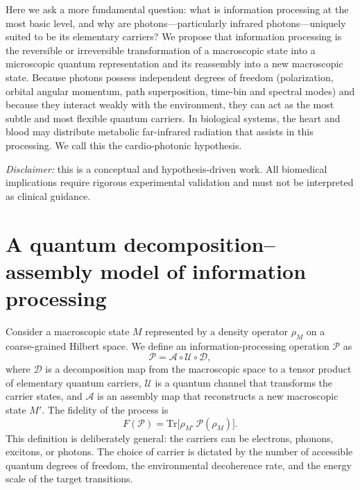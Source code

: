 \documentclass[11pt,a4paper]{article}
\begin{document}
Here we ask a more fundamental question: what is information processing at the most basic level, and why are photons---particularly infrared photons---uniquely suited to be its elementary carriers? We propose that information processing is the reversible or irreversible transformation of a macroscopic state into a microscopic quantum representation and its reassembly into a new macroscopic state. Because photons possess independent degrees of freedom (polarization, orbital angular momentum, path superposition, time-bin and spectral modes) and because they interact weakly with the environment, they can act as the most subtle and most flexible quantum carriers. In biological systems, the heart and blood may distribute metabolic far-infrared radiation that assists in this processing. We call this the cardio-photonic hypothesis.

\textit{Disclaimer:} this is a conceptual and hypothesis-driven work. All biomedical implications require rigorous experimental validation and must not be interpreted as clinical guidance.

\section*{A quantum decomposition--assembly model of information processing}

Consider a macroscopic state $M$ represented by a density operator $\rho_M$ on a coarse-grained Hilbert space. We define an information-processing operation $\mathcal{P}$ as
\begin{equation}
\mathcal{P} = \mathcal{A} \circ \mathcal{U} \circ \mathcal{D},
\end{equation}
where $\mathcal{D}$ is a decomposition map from the macroscopic space to a tensor product of elementary quantum carriers, $\mathcal{U}$ is a quantum channel that transforms the carrier states, and $\mathcal{A}$ is an assembly map that reconstructs a new macroscopic state $M'$. The fidelity of the process is
\begin{equation}
F(\mathcal{P}) = \mathrm{Tr}\bigl[\rho_{M'} \,\mathcal{P}(\rho_M)\bigr].
\end{equation}
This definition is deliberately general: the carriers can be electrons, phonons, excitons, or photons. The choice of carrier is dictated by the number of accessible quantum degrees of freedom, the environmental decoherence rate, and the energy scale of the target transitions.
\end{document}
